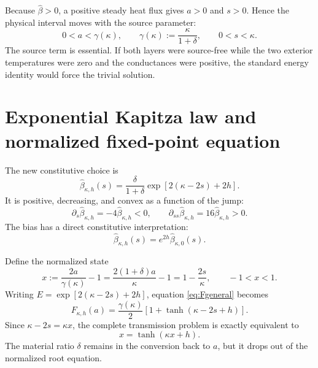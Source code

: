\documentclass[10pt,a4paper]{article}
\newcommand{\betahat}{\widehat{\beta}}
\begin{document}
Because \(\betahat>0\), a positive steady heat flux gives \(a>0\) and
\(s>0\). Hence the physical interval moves with the source parameter:
\begin{equation}
  0<a<\gamma(\kappa),
  \qquad
  \gamma(\kappa):=\frac{\kappa}{1+\delta},
  \qquad
  0<s<\kappa.
  \label{eq:physical}
\end{equation}
The source term is essential. If both layers were source-free while the two
exterior temperatures were zero and the conductances were positive, the
standard energy identity would force the trivial solution.

\section{Exponential Kapitza law and normalized fixed-point equation}

The new constitutive choice is
\begin{equation}
  \boxed{
  \betahat_{\kappa,h}(s)
  =\frac{\delta}{1+\delta}
  \exp\!\left[2(\kappa-2s)+2h\right].}
  \label{eq:beta}
\end{equation}
It is positive, decreasing, and convex as a function of the jump:
\begin{equation}
  \partial_s\betahat_{\kappa,h}=-4\betahat_{\kappa,h}<0,
  \qquad
  \partial_{ss}\betahat_{\kappa,h}=16\betahat_{\kappa,h}>0.
\end{equation}
The bias has a direct constitutive interpretation:
\begin{equation}
  \betahat_{\kappa,h}(s)=e^{2h}\betahat_{\kappa,0}(s).
\end{equation}

Define the normalized state
\begin{equation}
  x:=\frac{2a}{\gamma(\kappa)}-1
  =\frac{2(1+\delta)a}{\kappa}-1
  =1-\frac{2s}{\kappa},
  \qquad -1<x<1.
  \label{eq:x}
\end{equation}
Writing \(E=\exp[2(\kappa-2s)+2h]\), equation \eqref{eq:Fgeneral} becomes
\begin{equation}
  F_{\kappa,h}(a)
  =\frac{\gamma(\kappa)}{2}
   \left[1+\tanh(\kappa-2s+h)\right].
\end{equation}
Since \(\kappa-2s=\kappa x\), the complete transmission problem is exactly
equivalent to
\begin{equation}
  \boxed{x=\tanh(\kappa x+h).}
  \label{eq:normalized}
\end{equation}
The material ratio \(\delta\) remains in the conversion back to \(a\), but it
drops out of the normalized root equation.
\end{document}
